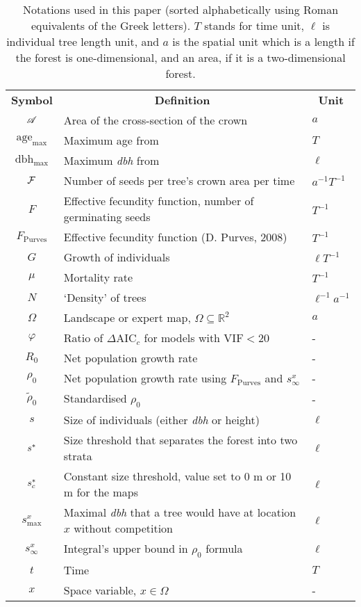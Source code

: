 \begin{table}[h]
	\centering
	\caption{Notations used in this paper (sorted alphabetically using Roman equivalents of the Greek letters). $ T $ stands for time unit, $ \ell $ is individual tree length unit, and $ a $ is the spatial unit which is a length if the forest is one-dimensional, and an area, if it is a two-dimensional forest.} \label{tab::notations}
	\begin{tabular}{@{}cll@{}}
		\toprule
		\textbf{Symbol} & \multicolumn{1}{c}{\textbf{Definition}} & \multicolumn{1}{c}{\textbf{Unit}} \\
		$ \mathscr{A} $ & Area of the cross-section of the crown &  $ a $ \\
		$ \text{age}_{\max} $ & Maximum age from \citet{Burns1990, Burns1990a} & $ T $ \\
		$ \text{dbh}_{\max} $ & Maximum \textit{dbh} from \citet{Burns1990, Burns1990a} & $ \ell $ \\
		$ \mathcal{F} $ & Number of seeds per tree's crown area per time & $ a^{-1} T^{-1} $ \\
		$ F $ & Effective fecundity function, \ie number of germinating seeds & $ T^{-1} $ \\
		$ F_{\text{Purves}} $ & Effective fecundity function (D. Purves, 2008) & $ T^{-1} $ \\
		$ G $ & Growth of individuals & $ \ell T^{-1} $ \\
		$ \mu $ & Mortality rate & $ T^{-1} $ \\
		$ N $ & `Density' of trees & $ \ell^{-1} a^{-1} $ \\
		$ \Omega $ & Landscape or expert map, $ \Omega \subseteq \mathds{R}^2 $ & $ a $ \\
		$ \varphi $ & Ratio of $ \Delta \text{AIC}_c $ for models with $ \text{VIF} < 20 $ & - \\
		$ R_0 $ & Net population growth rate & - \\
		$ \rho_0 $ & Net population growth rate using $ F_{\text{Purves}} $ and $ s_{\infty}^{x} $ & - \\
		$ \tilde \rho_0 $ & Standardised $ \rho_0 $ & - \\
		$ s $ & Size of individuals (either \textit{dbh} or height) & $ \ell $ \\
		$ {s}^{*} $ & Size threshold that separates the forest into two strata & $ \ell $ \\
		$ {s}^{*}_c $ & Constant size threshold, value set to 0 m or 10 m for the maps & $ \ell $ \\
		$ s_{\max}^{x} $ & Maximal \textit{dbh} that a tree would have at location $ x $ without competition & $ \ell $ \\
		$ s_{\infty}^{x} $ & Integral's upper bound in $ \rho_0 $ formula & $ \ell $ \\
		$ t $ & Time & $ T $ \\
		$ x $ & Space variable, $ x \in \Omega $ & - \\
		\bottomrule
	\end{tabular}
\end{table}


